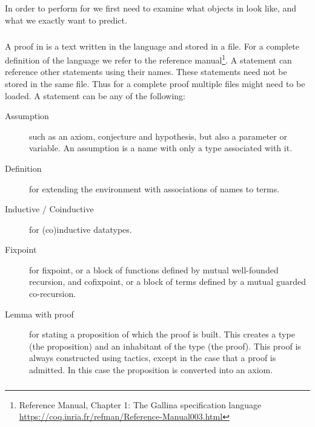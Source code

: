 \subsection{\coq}

In order to perform \premiseselection for \coq we first need to examine what objects in \coq look like, and what we exactly want to predict.

\subsubsection{\gallina}
A proof in \coq is a text written in the \gallina{} language \cite{huet1992gallina} and stored in a file.
For a complete definition of the \gallina language we refer to the \coq reference manual\footnote{\coq Reference Manual, Chapter 1: The Gallina specification language\\ \url{https://coq.inria.fr/refman/Reference-Manual003.html}}.
A statement can reference other statements using their names.
These statements need not be stored in the same file.
Thus for a complete proof multiple files might need to be loaded.
A statement can be any of the following:
\begin{description}
	\item[Assumption] such as an axiom, conjecture and hypothesis, but also a parameter or variable.
		An assumption is a name with only a type associated with it.
	\item[Definition] for extending the environment with associations of names to terms.
	\item[Inductive / Coinductive] for (co)inductive datatypes.
	\item[Fixpoint] for fixpoint, or a block of functions defined by mutual well-founded recursion, and cofixpoint, or a block of terms defined by a mutual guarded co-recursion.
	\item[Lemma with proof] for stating a proposition of which the proof is built.
		This creates a type (the proposition) and an inhabitant of the type (the proof).
		This proof is always constructed using tactics, except in the case that a proof is admitted.
		In this case the proposition is converted into an axiom.
\end{description}


\subsubsection{\pcic}

